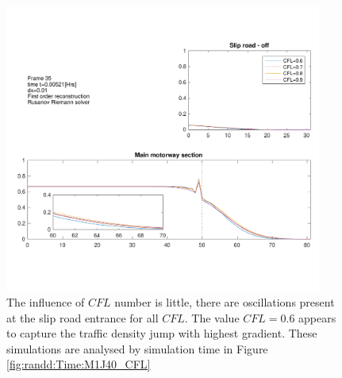 	\begin{figure}
    		\centering
        		\includegraphics[trim=20 75 10 55,clip,width=0.93\textwidth]{M1J40_cfl.pdf}
		\caption[Wakefield M1J40 : Density profile for varying $CFL$]{The influence of $CFL$ number is little, there are oscillations present at the slip road entrance for all $CFL$. The value $CFL=0.6$ appears to capture the traffic density jump with highest gradient. These simulations are analysed by simulation time in Figure \ref{fig:randd:Time:M1J40_CFL}}
		\label{fig:randd:M1J40:cfl}
	\end{figure}
	
